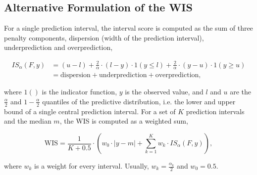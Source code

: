 \documentclass{article}
\begin{document}
\subsection{Alternative Formulation of the WIS}
For a single prediction interval, the interval score is computed as the sum of three penalty components, dispersion (width of the prediction interval), underprediction and overprediction,  
%
\begin{linenomath*}
\begin{align*}
 IS_\alpha(F,y) &= (u-l) + \frac{2}{\alpha} \cdot (l-y) \cdot 1(y \leq l) + \frac{2}{\alpha} \cdot (y-u) \cdot 1(y \geq u) \\
 &= \text{dispersion} + \text{underprediction} + \text{overprediction},    
\end{align*}
\end{linenomath*}
%
where $1()$ is the indicator function, $y$ is the observed value, and $l$ and $u$ are the $\frac{\alpha}{2}$ and $1 - \frac{\alpha}{2}$ quantiles of the predictive distribution, i.e. the lower and upper bound of a single central prediction interval. For a set of $K$ prediction intervals and the median $m$, the WIS is computed as a weighted sum, 
\begin{linenomath*}
\begin{equation*}
\text{WIS} = \frac{1}{K + 0.5} \cdot \left(w_0 \cdot |y - m| + \sum_{k = 1}^{K} w_k \cdot IS_{\alpha}(F, y)\right),    
\end{equation*} 
\end{linenomath*}
where $w_k$ is a weight for every interval. Usually, $w_k = \frac{\alpha_k}{2}$ and $w_0 = 0.5$. 




\clearpage

\end{document}
